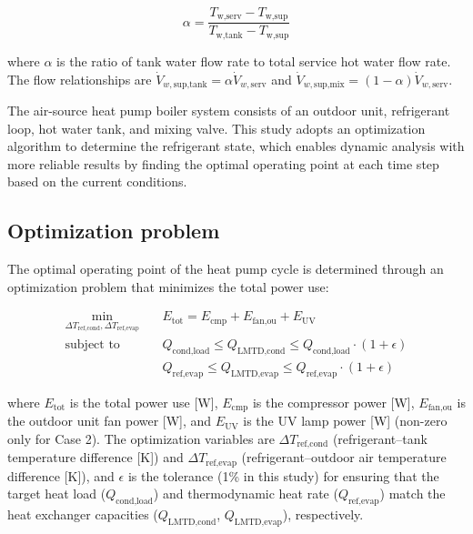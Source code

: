 \documentclass[letterpaper,10pt]{article}
\begin{document}
\begin{equation}
\label{eq:hpb_mixing_ratio}
\alpha = \frac{T_{\text{w,serv}} - T_{\text{w,sup}}}{T_{\text{w,tank}} - T_{\text{w,sup}}}
\end{equation}

where $\alpha$ is the ratio of tank water flow rate to total service hot water flow rate. The flow relationships are $\dot{V}_{w,\text{sup,tank}} = \alpha \dot{V}_{w,\text{serv}}$ and $\dot{V}_{w,\text{sup,mix}} = (1 - \alpha) \dot{V}_{w,\text{serv}}$.

The air-source heat pump boiler system consists of an outdoor unit, refrigerant loop, hot water tank, and mixing valve. This study adopts an optimization algorithm to determine the refrigerant state, which enables dynamic analysis with more reliable results by finding the optimal operating point at each time step based on the current conditions.

\subsection{Optimization problem}

The optimal operating point of the heat pump cycle is determined through an optimization problem that minimizes the total power use:

\begin{equation}
\label{eq:hpb_optimization}
\begin{aligned}
\min_{\Delta T_{\text{ref,cond}}, \Delta T_{\text{ref,evap}}} \quad & E_{\text{tot}} = E_{\text{cmp}} + E_{\text{fan,ou}} + E_{\text{UV}} \\
\text{subject to} \quad & Q_{\text{cond,load}} \leq Q_{\text{LMTD,cond}} \leq Q_{\text{cond,load}} \cdot (1 + \epsilon) \\
& Q_{\text{ref,evap}} \leq Q_{\text{LMTD,evap}} \leq Q_{\text{ref,evap}} \cdot (1 + \epsilon)
\end{aligned}
\end{equation}

where $E_{\text{tot}}$ is the total power use [W], $E_{\text{cmp}}$ is the compressor power [W], $E_{\text{fan,ou}}$ is the outdoor unit fan power [W], and $E_{\text{UV}}$ is the UV lamp power [W] (non-zero only for Case 2). The optimization variables are $\Delta T_{\text{ref,cond}}$ (refrigerant--tank temperature difference [K]) and $\Delta T_{\text{ref,evap}}$ (refrigerant--outdoor air temperature difference [K]), and $\epsilon$ is the tolerance (1\% in this study) for ensuring that the target heat load ($Q_{\text{cond,load}}$) and thermodynamic heat rate ($Q_{\text{ref,evap}}$) match the heat exchanger capacities ($Q_{\text{LMTD,cond}}$, $Q_{\text{LMTD,evap}}$), respectively.
\end{document}
